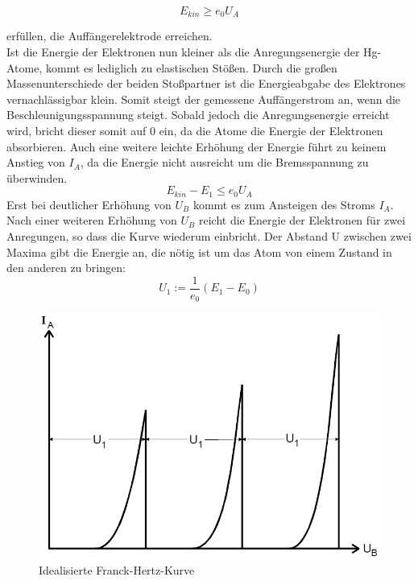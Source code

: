 \begin{equation}
E_{kin} \geq e_0 U_A
\end{equation}

erfüllen, die Auffängerelektrode erreichen.\\

Ist die Energie der Elektronen nun kleiner als die Anregungsenergie der Hg-Atome, kommt es lediglich zu elastischen Stößen. Durch die großen Massenunterschiede der beiden Stoßpartner ist die Energieabgabe des Elektrones vernachlässigbar klein. Somit steigt der gemessene Auffängerstrom an, wenn die Beschleunigungsspannung steigt. 
Sobald jedoch die Anregungsenergie erreicht wird, bricht dieser somit auf 0 ein, da die Atome die Energie der Elektronen absorbieren. Auch eine weitere leichte Erhöhung der Energie führt zu keinem Anstieg von $I_A$, da die Energie nicht ausreicht um die Bremsspannung zu überwinden.
\begin{equation*}
E_{kin} - E_1 \leq e_0 U_A
\end{equation*}
Erst bei deutlicher Erhöhung von $U_B$ kommt es zum Ansteigen des Stroms $I_A$.\\
Nach einer weiteren Erhöhung von $U_B$ reicht die Energie der Elektronen für zwei Anregungen, so dass die Kurve wiederum einbricht. Der Abstand U zwischen zwei Maxima gibt die Energie an, die nötig ist um das Atom von einem Zustand in den anderen zu bringen:
\begin{equation}
U_1 := \frac{1}{e_0}(E_1 - E_0)
\end{equation}

\begin{figure}[h]
	\centering
	\includegraphics[scale = 0.6]{Grafiken/V601_Abb2.jpg}
	\caption{Idealisierte Franck-Hertz-Kurve}
\end{figure}
\newpage
